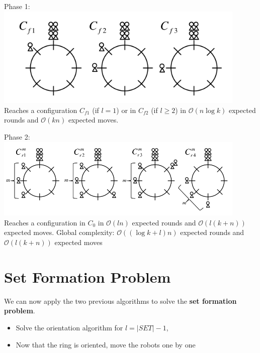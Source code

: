 \documentclass{beamer}
\begin{document}
\begin{frame} 
	Phase 1:
	\includegraphics[width=0.9\textwidth]{images/orient1.png}
	\pause
	Reaches a configuration $C_{f1}$ (if $l = 1$) or in $C_{f2}$ (if $l \geq 2$)
	 in $\mathcal{O}(n \log{k})$ expected rounds and $\mathcal{O}(kn)$ expected moves.
\end{frame}

\begin{frame}
	Phase 2:
	\includegraphics[width=0.9\textwidth]{images/orient2.png}
	\pause
	Reaches a configuration in $C_0$ in $\mathcal{O}(ln)$ expected rounds and $\mathcal{O}(l(k+n))$ expected moves.
	\pause
	Global complexity: $\mathcal{O}((\log{k} + l)n)$ expected rounds 
	and $\mathcal{O}(l(k+n))$ expected moves
\end{frame}

\section{Set Formation Problem}
\begin{frame}
	We can now apply the two previous algorithms to solve the \textbf{set formation problem}.
\end{frame}

\begin{frame}
	\begin{itemize}
		\item<1-> Solve the orientation algorithm for $l = |SET| - 1$,
		\item<2-> Now that the ring is oriented, move the robots one by one
	\end{itemize}
	
\end{frame}
\end{document}
